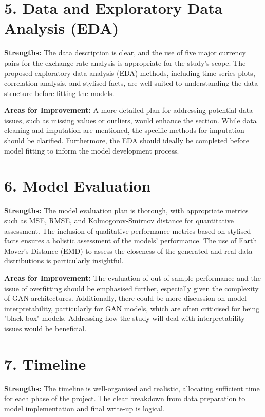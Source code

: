 \documentclass[a4paper,12pt]{article}
\begin{document}
\section*{5. Data and Exploratory Data Analysis (EDA)}

\textbf{Strengths:}  
The data description is clear, and the use of five major currency pairs for the exchange rate analysis is appropriate for the study's scope. The proposed exploratory data analysis (EDA) methods, including time series plots, correlation analysis, and stylised facts, are well-suited to understanding the data structure before fitting the models.

\textbf{Areas for Improvement:}  
A more detailed plan for addressing potential data issues, such as missing values or outliers, would enhance the section. While data cleaning and imputation are mentioned, the specific methods for imputation should be clarified. Furthermore, the EDA should ideally be completed before model fitting to inform the model development process.

\section*{6. Model Evaluation}

\textbf{Strengths:}  
The model evaluation plan is thorough, with appropriate metrics such as MSE, RMSE, and Kolmogorov-Smirnov distance for quantitative assessment. The inclusion of qualitative performance metrics based on stylised facts ensures a holistic assessment of the models’ performance. The use of Earth Mover’s Distance (EMD) to assess the closeness of the generated and real data distributions is particularly insightful.

\textbf{Areas for Improvement:}  
The evaluation of out-of-sample performance and the issue of overfitting should be emphasised further, especially given the complexity of GAN architectures. Additionally, there could be more discussion on model interpretability, particularly for GAN models, which are often criticised for being "black-box" models. Addressing how the study will deal with interpretability issues would be beneficial.

\section*{7. Timeline}

\textbf{Strengths:}  
The timeline is well-organised and realistic, allocating sufficient time for each phase of the project. The clear breakdown from data preparation to model implementation and final write-up is logical.
\end{document}
